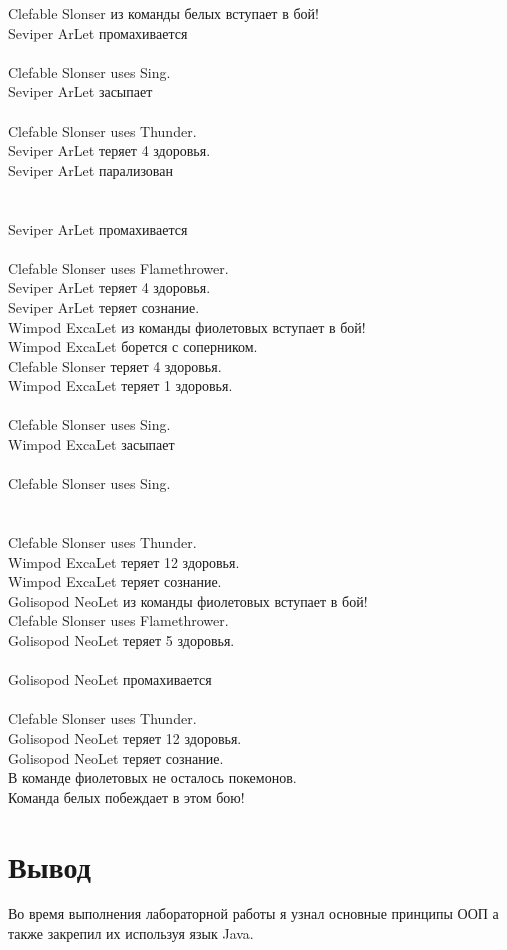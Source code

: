 \documentclass[12pt,onecolumn]{article}
\begin{document}
Clefable Slonser из команды белых вступает в бой!\\
Seviper ArLet промахивается\\
\\
Clefable Slonser uses Sing.\\
Seviper ArLet засыпает\\
\\
Clefable Slonser uses Thunder.\\
Seviper ArLet теряет 4 здоровья.\\
Seviper ArLet парализован\\
\\
\\
Seviper ArLet промахивается\\
\\
Clefable Slonser uses Flamethrower.\\
Seviper ArLet теряет 4 здоровья.\\
Seviper ArLet теряет сознание.\\
Wimpod ExcaLet из команды фиолетовых вступает в бой!\\
Wimpod ExcaLet борется с соперником.\\
Clefable Slonser теряет 4 здоровья.\\
Wimpod ExcaLet теряет 1 здоровья.\\
\\
Clefable Slonser uses Sing.\\
Wimpod ExcaLet засыпает\\
\\
Clefable Slonser uses Sing.\\
\\
\\
Clefable Slonser uses Thunder.\\
Wimpod ExcaLet теряет 12 здоровья.\\
Wimpod ExcaLet теряет сознание.\\
Golisopod NeoLet из команды фиолетовых вступает в бой!\\
Clefable Slonser uses Flamethrower.\\
Golisopod NeoLet теряет 5 здоровья.\\
\\
Golisopod NeoLet промахивается\\
\\
Clefable Slonser uses Thunder.\\
Golisopod NeoLet теряет 12 здоровья.\\
Golisopod NeoLet теряет сознание.\\
В команде фиолетовых не осталось покемонов.\\
Команда белых побеждает в этом бою!\\

\section{Вывод}
Во время выполнения лабораторной работы я узнал основные принципы ООП а также закрепил их используя язык Java.
\end{document}
